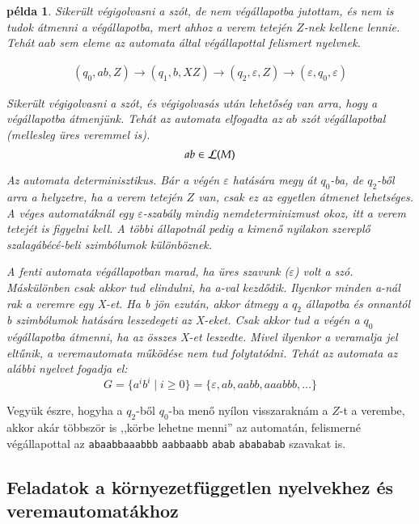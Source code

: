 \documentclass[a4paper]{article}
\newtheorem{pelda}{példa}[section]
\begin{document}
\begin{pelda}
Sikerült végigolvasni a szót, de nem végállapotba jutottam, és nem is
tudok átmenni a végállapotba, mert ahhoz a verem tetején $Z$-nek kellene
lennie. Tehát $aab$ sem eleme az automata által végállapottal felismert
nyelvnek.

\begin{gather*}
(q_0,ab,Z) \to (q_1,b,XZ) \to (q_2,\varepsilon,Z) \to
(\varepsilon,q_0,\varepsilon)
\end{gather*}

Sikerült végigolvasni a szót, és végigolvasás után lehetőség van arra,
hogy a végállapotba átmenjünk. Tehát az automata elfogadta az $ab$ szót
végállapotbal (mellesleg üres veremmel is).
\[ab \in {\cal L} (M)\]

Az automata determinisztikus. Bár a végén $\varepsilon$ hatására megy át
$q_0$-ba, de $q_2$-ből arra a helyzetre, ha a verem tetején $Z$ van,
csak ez az egyetlen átmenet lehetséges. A véges automatáknál egy
$\varepsilon$-szabály mindig nemdeterminizmust okoz, itt a verem tetejét
is figyelni kell. A többi állapotnál pedig a kimenő
nyilakon szereplő szalagábécé-beli szimbólumok különböznek.

A fenti automata végállapotban marad, ha üres szavunk ($\varepsilon$) volt
a szó. Máskülönben csak akkor tud elindulni, ha a-val kezdődik.
Ilyenkor minden a-nál rak a veremre egy X-et. Ha b jön ezután, akkor
átmegy a $q_2$ állapotba és onnantól b szimbólumok hatására leszedegeti az
X-eket. Csak akkor tud a végén a $q_0$ végállapotba átmenni, ha az
összes X-et leszedte. Mivel ilyenkor a veramalja jel eltűnik, a
veremautomata működése nem tud folytatódni. Tehát az automata az alábbi
nyelvet fogadja el:
\[G = \{a^ib^i  \mid i \ge 0\}=\{\varepsilon, ab, aabb, aaabbb, \ldots\}\]
\end{pelda}

Vegyük észre, hogyha a $q_2$-ből $q_0$-ba menő nyílon visszaraknám a
$Z$-t a verembe, akkor akár többször is ,,körbe lehetne menni'' az
automatán, felismerné végállapottal az \verb'abaabbaaabbb' \verb'aabbaabb'
\verb'abab' \verb'abababab' szavakat is.


\subsection{Feladatok a környezetfüggetlen nyelvekhez és veremautomatákhoz}
\end{document}
